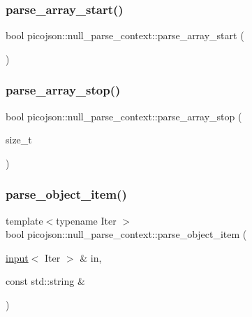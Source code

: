 \subsubsection{\texorpdfstring{parse\+\_\+array\+\_\+start()}{parse\_array\_start()}}
{\footnotesize\ttfamily bool picojson\+::null\+\_\+parse\+\_\+context\+::parse\+\_\+array\+\_\+start (\begin{DoxyParamCaption}{ }\end{DoxyParamCaption})\hspace{0.3cm}{\ttfamily [inline]}}

\hypertarget{classpicojson_1_1null__parse__context_a8a763b600c17c5db42aee9afb2d2551d}{}\label{classpicojson_1_1null__parse__context_a8a763b600c17c5db42aee9afb2d2551d} 
\subsubsection{\texorpdfstring{parse\+\_\+array\+\_\+stop()}{parse\_array\_stop()}}
{\footnotesize\ttfamily bool picojson\+::null\+\_\+parse\+\_\+context\+::parse\+\_\+array\+\_\+stop (\begin{DoxyParamCaption}\item[{size\+\_\+t}]{ }\end{DoxyParamCaption})\hspace{0.3cm}{\ttfamily [inline]}}

\hypertarget{classpicojson_1_1null__parse__context_a97c4b81a984ea473fe56e09aed7b9ca6}{}\label{classpicojson_1_1null__parse__context_a97c4b81a984ea473fe56e09aed7b9ca6} 
\subsubsection{\texorpdfstring{parse\+\_\+object\+\_\+item()}{parse\_object\_item()}}
{\footnotesize\ttfamily template$<$typename Iter $>$ \\
bool picojson\+::null\+\_\+parse\+\_\+context\+::parse\+\_\+object\+\_\+item (\begin{DoxyParamCaption}\item[{\hyperlink{classpicojson_1_1input}{input}$<$ Iter $>$ \&}]{in,  }\item[{const std\+::string \&}]{ }\end{DoxyParamCaption})\hspace{0.3cm}{\ttfamily [inline]}}

